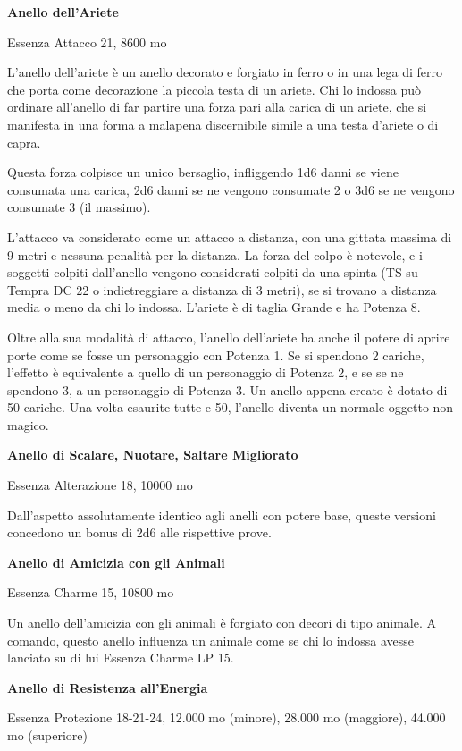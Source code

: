 \documentclass[a4paper,11pt,twoside,openany]{book}
\begin{document}
\textbf{Anello dell'Ariete}

Essenza Attacco 21, 8600 mo

L'anello dell'ariete è un anello decorato e forgiato in ferro o in una lega di ferro che porta come decorazione la piccola testa di un ariete. Chi lo indossa può ordinare all'anello di far partire una forza pari alla carica di un ariete, che si manifesta in una forma a malapena discernibile simile a una testa d'ariete o di capra.

Questa forza colpisce un unico bersaglio, infliggendo 1d6 danni se viene consumata una carica, 2d6 danni se ne vengono consumate 2 o 3d6 se ne vengono consumate 3 (il massimo).

L'attacco va considerato come un attacco a distanza, con una gittata massima di 9 metri e nessuna penalità per la distanza. La forza del colpo è notevole, e i soggetti colpiti dall'anello vengono considerati colpiti da una spinta (TS su Tempra DC 22 o indietreggiare a distanza di 3 metri), se si trovano a distanza media o meno da chi lo indossa. L'ariete è di taglia Grande e ha Potenza 8.

Oltre alla sua modalità di attacco, l'anello dell'ariete ha anche il potere di aprire porte come se fosse un personaggio con Potenza 1. Se si spendono 2 cariche, l'effetto è equivalente a quello di un personaggio di Potenza 2, e se se ne spendono 3, a un personaggio di Potenza 3. Un anello appena creato è dotato di 50 cariche. Una volta esaurite tutte e 50, l'anello diventa un normale oggetto non magico.

\textbf{Anello di Scalare, Nuotare, Saltare Migliorato}

Essenza Alterazione 18, 10000 mo

Dall'aspetto assolutamente identico agli anelli con potere base, queste
versioni concedono un bonus di 2d6 alle rispettive prove.

\textbf{Anello di Amicizia con gli Animali}

Essenza Charme 15, 10800 mo

Un anello dell'amicizia con gli animali è forgiato con decori di tipo animale. A comando, questo anello influenza un animale come se chi lo indossa avesse lanciato su di lui Essenza Charme LP 15.

\textbf{Anello di Resistenza all'Energia}

Essenza Protezione 18-21-24, 12.000 mo (minore), 28.000 mo (maggiore),
44.000 mo (superiore)
\end{document}
